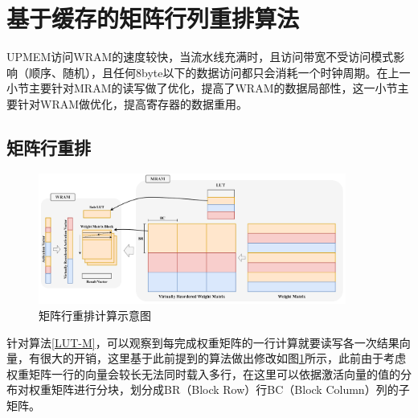 \section{基于缓存的矩阵行列重排算法}
UPMEM访问WRAM的速度较快，当流水线充满时，且访问带宽不受访问模式影响（顺序、随机），且任何8byte以下的数据访问都只会消耗一个时钟周期\cite{BenchmarkingMutlu}。在上一小节主要针对MRAM的读写做了优化，提高了WRAM的数据局部性，这一小节主要针对WRAM做优化，提高寄存器的数据重用。

\subsection{矩阵行重排}

\begin{figure}[!htbp]
	\centering
    \includegraphics[width=0.9\textwidth]{figures/LUTRow.pdf}
	\caption{矩阵行重排计算示意图}
    \label{LUTRow}
\end{figure}

针对算法\ref{LUT-M}，可以观察到每完成权重矩阵的一行计算就要读写各一次结果向量，有很大的开销，这里基于此前提到的算法做出修改如图\ref{LUTRow}所示，此前由于考虑权重矩阵一行的向量会较长无法同时载入多行，在这里可以依据激活向量的值的分布对权重矩阵进行分块，划分成BR（Block Row）行BC（Block Column）列的子矩阵。


